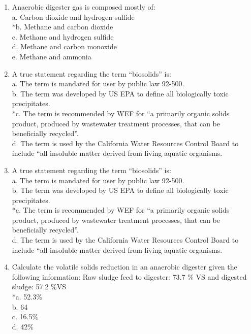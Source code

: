 \documentclass{article}
\begin{document}
\begin{enumerate}
\item  Anaerobic digester gas is composed mostly of: \\

a. Carbon dioxide and hydrogen sulfide \\
*b. Methane and carbon dioxide \\
c. Methane and hydrogen sulfide \\
d. Methane and carbon monoxide \\
e. Methane and ammonia \\

\item  A true statement regarding the term “biosolids” is: \\

a. The term is mandated for user by public law 92-500. \\
b. The term was developed by US EPA to define all biologically toxic precipitates. \\
*c. The term is recommended by WEF for “a primarily organic solids product, produced by wastewater treatment processes, that can be beneficially recycled”. \\
d. The term is used by the California Water Resources Control Board to include “all insoluble matter derived from living aquatic organisms. \\

\item  A true statement regarding the term “biosolids” is: \\

a. The term is mandated for user by public law 92-500. \\
b. The term was developed by US EPA to define all biologically toxic precipitates. \\
*c. The term is recommended by WEF for “a primarily organic solids product, produced by wastewater treatment processes, that can be beneficially recycled”. \\
d. The term is used by the California Water Resources Control Board to include “all insoluble matter derived from living aquatic organisms. \\

\item  Calculate the volatile solids reduction in an anaerobic digester given the following information:  Raw sludge feed to digester:  73.7 \% VS and digested sludge: 57.2 \%VS \\

*a. 52.3\% \\
b. 64 \\
c. 16.5\% \\
d. 42\% \\


\end{enumerate}
\end{document}
